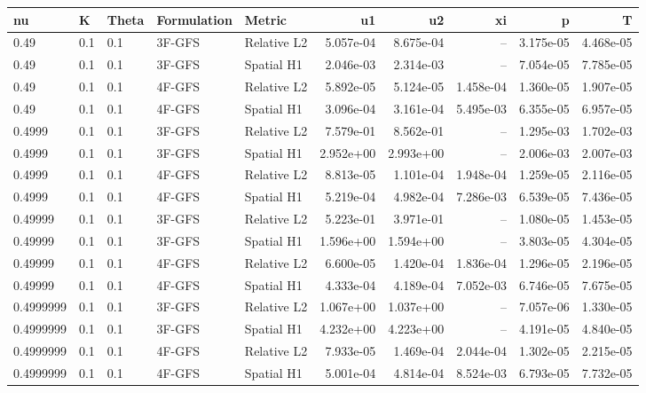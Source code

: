 \begin{tabular}{lllllrrrrr}
\hline
nu & K & Theta & Formulation & Metric & u1 & u2 & xi & p & T \\
\hline
0.49 & 0.1 & 0.1 & 3F-GFS & Relative L2 & 5.057e-04 & 8.675e-04 & -- & 3.175e-05 & 4.468e-05 \\
0.49 & 0.1 & 0.1 & 3F-GFS & Spatial H1 & 2.046e-03 & 2.314e-03 & -- & 7.054e-05 & 7.785e-05 \\
0.49 & 0.1 & 0.1 & 4F-GFS & Relative L2 & 5.892e-05 & 5.124e-05 & 1.458e-04 & 1.360e-05 & 1.907e-05 \\
0.49 & 0.1 & 0.1 & 4F-GFS & Spatial H1 & 3.096e-04 & 3.161e-04 & 5.495e-03 & 6.355e-05 & 6.957e-05 \\
0.4999 & 0.1 & 0.1 & 3F-GFS & Relative L2 & 7.579e-01 & 8.562e-01 & -- & 1.295e-03 & 1.702e-03 \\
0.4999 & 0.1 & 0.1 & 3F-GFS & Spatial H1 & 2.952e+00 & 2.993e+00 & -- & 2.006e-03 & 2.007e-03 \\
0.4999 & 0.1 & 0.1 & 4F-GFS & Relative L2 & 8.813e-05 & 1.101e-04 & 1.948e-04 & 1.259e-05 & 2.116e-05 \\
0.4999 & 0.1 & 0.1 & 4F-GFS & Spatial H1 & 5.219e-04 & 4.982e-04 & 7.286e-03 & 6.539e-05 & 7.436e-05 \\
0.49999 & 0.1 & 0.1 & 3F-GFS & Relative L2 & 5.223e-01 & 3.971e-01 & -- & 1.080e-05 & 1.453e-05 \\
0.49999 & 0.1 & 0.1 & 3F-GFS & Spatial H1 & 1.596e+00 & 1.594e+00 & -- & 3.803e-05 & 4.304e-05 \\
0.49999 & 0.1 & 0.1 & 4F-GFS & Relative L2 & 6.600e-05 & 1.420e-04 & 1.836e-04 & 1.296e-05 & 2.196e-05 \\
0.49999 & 0.1 & 0.1 & 4F-GFS & Spatial H1 & 4.333e-04 & 4.189e-04 & 7.052e-03 & 6.746e-05 & 7.675e-05 \\
0.4999999 & 0.1 & 0.1 & 3F-GFS & Relative L2 & 1.067e+00 & 1.037e+00 & -- & 7.057e-06 & 1.330e-05 \\
0.4999999 & 0.1 & 0.1 & 3F-GFS & Spatial H1 & 4.232e+00 & 4.223e+00 & -- & 4.191e-05 & 4.840e-05 \\
0.4999999 & 0.1 & 0.1 & 4F-GFS & Relative L2 & 7.933e-05 & 1.469e-04 & 2.044e-04 & 1.302e-05 & 2.215e-05 \\
0.4999999 & 0.1 & 0.1 & 4F-GFS & Spatial H1 & 5.001e-04 & 4.814e-04 & 8.524e-03 & 6.793e-05 & 7.732e-05 \\
\hline
\end{tabular}
